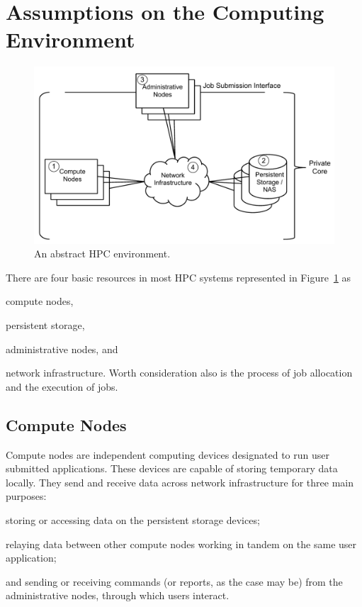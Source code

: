 \documentclass[oneside,12pt]{memoir}
\begin{document}
\section{Assumptions on the Computing Environment}
\begin{figure}
\centering
\includegraphics[scale=0.7]{abstract_hpc_environment.pdf}
\caption{An abstract HPC environment.}
\label{fig:abstract_hpc_environment}
\end{figure}
There are four basic resources in most HPC systems represented in Figure~\ref{fig:abstract_hpc_environment} as \begin{inparaenum}
\item compute nodes, \item persistent storage, \item administrative nodes, and \item network infrastructure. Worth consideration also is the process of job allocation and the execution of jobs.\end{inparaenum}

\subsection{Compute Nodes}
Compute nodes are independent computing devices designated to run user submitted applications. These devices are capable of storing temporary data locally. They send and receive data across network infrastructure for three main purposes:\begin{inparaenum}
\item storing or accessing data on the persistent storage devices;
\item relaying data between other compute nodes working in tandem on the same user application;
\item and sending or receiving commands (or reports, as the case may be) from the administrative nodes, through which users interact.\end{inparaenum} 
\end{document}
